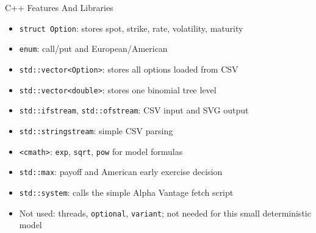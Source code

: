 \documentclass{beamer}
\begin{document}
\begin{frame}{C++ Features And Libraries}
  \begin{itemize}
    \item \texttt{struct Option}: stores spot, strike, rate, volatility, maturity
    \item \texttt{enum}: call/put and European/American
    \item \texttt{std::vector<Option>}: stores all options loaded from CSV
    \item \texttt{std::vector<double>}: stores one binomial tree level
    \item \texttt{std::ifstream}, \texttt{std::ofstream}: CSV input and SVG output
    \item \texttt{std::stringstream}: simple CSV parsing
    \item \texttt{<cmath>}: \texttt{exp}, \texttt{sqrt}, \texttt{pow} for model formulas
    \item \texttt{std::max}: payoff and American early exercise decision
    \item \texttt{std::system}: calls the simple Alpha Vantage fetch script
    \item Not used: threads, \texttt{optional}, \texttt{variant}; not needed for this small deterministic model
  \end{itemize}
\end{frame}
\end{document}
